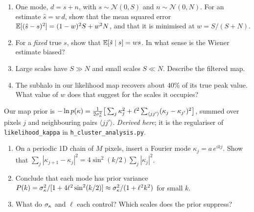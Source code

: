 
\begin{enumerate}
  \item One mode, $d = s + n$, with $s \sim \mathcal N(0, S)$ and $n \sim \mathcal N(0, N)$. For an estimate
    $\hat s = w\,d$, show that the mean squared error $\mathbb{E}[(\hat s - s)^2] = (1-w)^2S + w^2N$, and that it is minimised
    at $w = S/(S+N)$.
  \item For a \emph{fixed} true $s$, show that $\mathbb{E}[\hat s\mid s] = ws$. In what sense is the Wiener estimate biased?
  \item Large scales have $S \gg N$ and small scales $S \ll N$. Describe the filtered map.
  \item The subhalo in our likelihood map recovers about 40\% of its true peak value. What value of $w$ does that
    suggest for the scales it occupies?
\end{enumerate}



\begin{given}
Our map prior is
$-\ln p(\kappa) = \frac{1}{2\sigma_\kappa^2}\big[\sum_j\kappa_j^2 + \ell^2\sum_{\langle jj'\rangle}(\kappa_j - \kappa_{j'})^2\big]$,
summed over pixels $j$ and neighbouring pairs $\langle jj'\rangle$. \emph{Derived here}; it is the regulariser of
\texttt{likelihood\_kappa} in \texttt{h\_cluster\_analysis.py}.
\end{given}


\begin{enumerate}
  \item On a periodic 1D chain of $M$ pixels, insert a Fourier mode $\kappa_j = a\,e^{ikj}$. Show that
    $\sum_j |\kappa_{j+1} - \kappa_j|^2 = 4\sin^2(k/2)\sum_j|\kappa_j|^2$.
  \item Conclude that each mode has prior variance $P(k) = \sigma_\kappa^2/[1 + 4\ell^2\sin^2(k/2)] \approx \sigma_\kappa^2/(1+\ell^2k^2)$
    for small $k$.
  \item What do $\sigma_\kappa$ and $\ell$ each control? Which scales does the prior suppress?
\end{enumerate}

